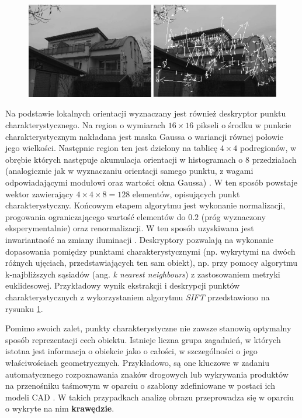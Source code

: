 \begin{figure}[!htb]
	\begin{center}
		\includegraphics[width=12cm]{images/sift_extraction_description_example.png}
	\end{center}	
\label{fig:SIFT_przyklad}
\end{figure}

Na podstawie lokalnych orientacji wyznaczany jest również deskryptor punktu charakterystycznego. Na region o wymiarach $16 \times 16$ pikseli o środku w punkcie charakterystycznym nakładana jest maska Gaussa o wariancji równej połowie jego wielkości. Następnie region ten jest dzielony na tablicę $4 \times 4$ podregionów, w obrębie których następuje akumulacja orientacji w histogramach o $8$ przedziałach (analogicznie jak w wyznaczaniu orientacji samego punktu, z wagami odpowiadającymi modułowi oraz wartości okna Gaussa) \cite{Lowe2004}. W ten sposób powstaje wektor zawierający $4 \times 4 \times 8 = 128$ elementów, opisujących punkt charakterystyczny. Końcowym etapem algorytmu jest wykonanie normalizacji, progowania ograniczającego wartość elementów do $0.2$ (próg wyznaczony eksperymentalnie) oraz renormalizacji. W ten sposób uzyskiwana jest inwariantność na zmiany iluminacji \cite{Lowe2004}. Deskryptory pozwalają na wykonanie dopasowania pomiędzy punktami charakterystycznymi (np. wykrytymi na dwóch różnych ujęciach, przedstawiających ten sam obiekt), np. przy pomocy algorytmu k-najbliższych sąsiadów (ang. \textit{k nearest neighbours}) z zastosowaniem metryki euklidesowej. Przykładowy wynik ekstrakcji i deskrypcji punktów charakterystycznych z wykorzystaniem algorytmu \textit{SIFT} przedstawiono na rysunku \ref{fig:SIFT_przyklad}.

Pomimo swoich zalet, punkty charakterystyczne nie zawsze stanowią optymalny sposób reprezentacji cech obiektu. Istnieje liczna grupa zagadnień, w których istotna jest informacja o obiekcie jako o całości, w szczególności o jego właściwościach geometrycznych. Przykładowo, są one kluczowe w zadaniu automatycznego rozpoznawania znaków drogowych lub wykrywania produktów na przenośniku taśmowym w oparciu o szablony zdefiniowane w postaci ich modeli CAD \cite{Treiber2010}. W takich przypadkach analizę obrazu przeprowadza się w oparciu o wykryte na nim \textbf{krawędzie}.

